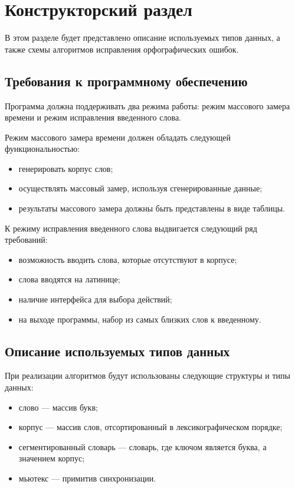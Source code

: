 \chapter{Конструкторский раздел}

В этом разделе будет представлено описание используемых типов данных, а также схемы алгоритмов исправления орфографических ошибок.

\section{Требования к программному обеспечению}

Программа должна поддерживать два режима работы: режим массового замера времени и режим исправления введенного слова.

Режим массового замера времени должен обладать следующей функциональностью:
\begin{itemize}
	\item генерировать корпус слов;
	\item осуществлять массовый замер, используя сгенерированные данные;
	\item результаты массового замера должны быть представлены в виде таблицы.
\end{itemize}

К режиму исправления введенного слова выдвигается следующий ряд требований:
\begin{itemize}
	\item возможность вводить слова, которые отсутствуют в корпусе;
	\item слова вводятся на латинице;
	\item наличие интерфейса для выбора действий;
	\item на выходе программы, набор из самых близких слов к введенному.
\end{itemize}

\section{Описание используемых типов данных}

При реализации алгоритмов будут использованы следующие структуры
и типы данных:
\begin{itemize}
	\item слово --- массив букв;
	\item корпус --- массив слов, отсортированный в лексикографическом порядке;
	\item сегментированный словарь --- словарь, где ключом является буква, а значением корпус;
	\item мьютекс --- примитив синхронизации.
\end{itemize}



